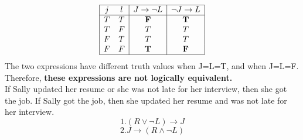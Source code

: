 \documentclass[12pt, letterpaper, twoside]{article}
\begin{document}
\begin{displaymath}
\begin{array}{|c c|c|c|}
\hline
j & l  & J \to \neg{L} & \neg{J} \to L\\ 
\hline 
T & T & \textbf{F} & \textbf{T}\\
T & F & T & T\\
F & T & T & T\\
F & F & \textbf{T} & \textbf{F}\\
\hline
\end{array}
\end{displaymath}
\break
The two expressions have different truth values when J=L=T, and when J=L=F. Therefore, \textbf{these expressions are not logically equivalent.}\\
\break
{}\quad If Sally updated her resume or she was not late for her interview, then she got the job.
If Sally got the job, then she updated her resume and was not late for her interview.
\[1. (R \lor \neg{L}) \to J\]
\[2. J \to(R \land \neg{L})\]
\end{document}
